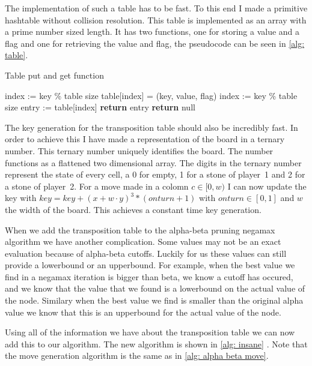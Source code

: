 \documentclass[a4paper]{article}
\begin{document}
The implementation of such a table has to be fast. To this end I made a
primitive hashtable without collision resolution. This table is implemented as
an array with a prime number sized length. It has two functions, one for
storing a value and a flag and one for retrieving the value and flag, the
pseudocode can be seen in \ref{alg: table}.

\begin{algorithm}
	\caption{Table put and get function}
	\label{alg: table}
	\begin{algorithmic}[1]
			\State index := key \% table size
			\State table[index] = (key, value, flag)
		\EndFunction
			\State index := key \% table size
			\State entry := table[index]
					\State \textbf{return} entry
				\EndIf
			\EndIf
			\State \textbf{return} null
		\EndFunction
	\end{algorithmic}
\end{algorithm}

The key generation for the transposition table should also be incredibly fast.
In order to achieve this I have made a representation of the board in a ternary
number. This ternary number uniquely identifies the board. The number functions
as a flattened two dimensional array. The digits in the ternary number
represent the state of every cell, a 0 for empty, 1 for a stone of player~1 and
2 for a stone of player~2. For a move made in a colomn $c \in [0, w)$ I can now
update the key with $key = key + (x + w \cdot y)^3 * (onturn + 1)$ with $onturn
\in [0,1]$ and $w$ the width of the board. This achieves a constant time key
generation.

When we add the transposition table to the alpha-beta pruning negamax algorithm
we have another complication. Some values may not be an exact evaluation
because of alpha-beta cutoffs. Luckily for us these values can still provide a
lowerbound or an upperbound. For example, when the best value we find in a
negamax iteration is bigger than beta, we know a cutoff has occured, and we
know that the value that we found is a lowerbound on the actual value of the
node. Similary when the best value we find is smaller than the original alpha
value we know that this is an upperbound for the actual value of the node.

Using all of the information we have about the transposition table we can now
add this to our algorithm. The new algorithm is shown in \ref{alg: insane}
\cite{wiki:negamax}. Note that the move generation algorithm is the same as in
\ref{alg: alpha beta move}.
\end{document}
